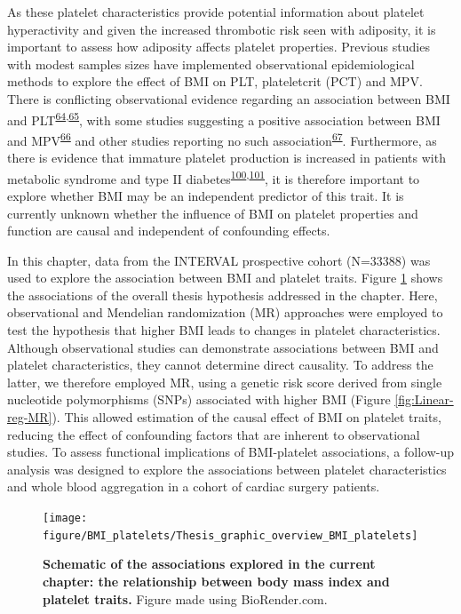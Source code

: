 \documentclass[11pt,twoside]{bristolthesis}
\begin{document}
As these platelet characteristics provide potential information about platelet hyperactivity and given the increased thrombotic risk seen with adiposity, it is important to assess how adiposity affects platelet properties. Previous studies with modest samples sizes have implemented observational epidemiological methods to explore the effect of BMI on PLT, plateletcrit (PCT) and MPV. There is conflicting observational evidence regarding an association between BMI and PLT\textsuperscript{\protect\hyperlink{ref-Furuncuoglu2016}{64},\protect\hyperlink{ref-Han2018a}{65}}, with some studies suggesting a positive association between BMI and MPV\textsuperscript{\protect\hyperlink{ref-Coban2005}{66}} and other studies reporting no such association\textsuperscript{\protect\hyperlink{ref-Heffron2018}{67}}. Furthermore, as there is evidence that immature platelet production is increased in patients with metabolic syndrome and type II diabetes\textsuperscript{\protect\hyperlink{ref-Vaduganathan2008a}{100},\protect\hyperlink{ref-Mijovic2015a}{101}}, it is therefore important to explore whether BMI may be an independent predictor of this trait. It is currently unknown whether the influence of BMI on platelet properties and function are causal and independent of confounding effects.

In this chapter, data from the INTERVAL prospective cohort (N=33388) was used to explore the association between BMI and platelet traits. Figure \ref{fig:BMI-platelet-overview} shows the associations of the overall thesis hypothesis addressed in the chapter. Here, observational and Mendelian randomization (MR) approaches were employed to test the hypothesis that higher BMI leads to changes in platelet characteristics. Although observational studies can demonstrate associations between BMI and platelet characteristics, they cannot determine direct causality. To address the latter, we therefore employed MR, using a genetic risk score derived from single nucleotide polymorphisms (SNPs) associated with higher BMI (Figure \ref{fig:Linear-reg-MR}). This allowed estimation of the causal effect of BMI on platelet traits, reducing the effect of confounding factors that are inherent to observational studies. To assess functional implications of BMI-platelet associations, a follow-up analysis was designed to explore the associations between platelet characteristics and whole blood aggregation in a cohort of cardiac surgery patients.



\begin{figure}
\texttt{[image: figure/BMI\_platelets/Thesis\_graphic\_overview\_BMI\_platelets]} \caption[Schematic of the associations explored in the current chapter: the relationship between body mass index and platelet traits.]{\textbf{Schematic of the associations explored in the current chapter: the relationship between body mass index and platelet traits.} Figure made using BioRender.com.}\label{fig:BMI-platelet-overview}
\end{figure}
\end{document}
